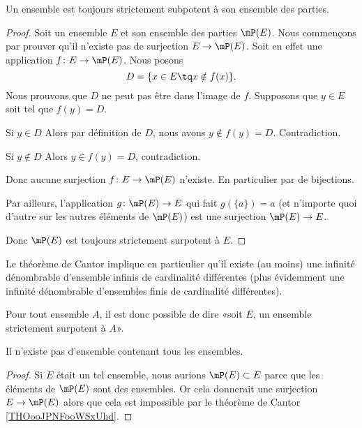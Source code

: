 \begin{theorem}     \label{THOooJPNFooWSxUhd}
    Un ensemble est toujours strictement subpotent à son ensemble des parties.
\end{theorem}

\begin{proof}
    Soit un ensemble \( E\) et son ensemble des parties \( \mP(E)\). Nous commençons par prouver qu'il n'existe pas de surjection \( E\to \mP(E)\). Soit en effet une application \( f\colon E\to \mP(E)\). Nous posons
    \begin{equation}
        D=\{ x\in E\tq x\notin f(x) \}.
    \end{equation}
    Nous prouvons que \( D\) ne peut pas être dans l'image de \( f\). Supposons que \( y\in E\) soit tel que \( f(y)=D\).
    \begin{subproof}
        \item[Si \( y\in D\)]
            Alors par définition de \( D\), nous avons \( y\notin f(y)=D\). Contradiction.
        \item[Si \( y\notin D\)]
            Alors \( y\in f(y)=D\), contradiction.
    \end{subproof}
    Donc aucune surjection \( f\colon E\to \mP(E)\) n'existe. En particulier par de bijections.

    Par ailleurs, l'application \( g\colon \mP(E)\to E\) qui fait \( g(\{ a \})=a\) (et n'importe quoi d'autre sur les autres éléments de \( \mP(E)\)) est une surjection \( \mP(E)\to E\).

    Donc \( \mP(E)\) est toujours strictement surpotent à \( E\).
\end{proof}

\begin{normaltext}
    Le théorème de Cantor implique en particulier qu'il existe (au moins) une infinité dénombrable d'ensemble infinis de cardinalité différentes (plus évidemment une infinité dénombrable d'ensembles finis de cardinalité différentes).

    Pour tout ensemble \( A\), il est donc possible de dire «soit \( E\), un ensemble strictement surpotent à \( A\)».
\end{normaltext}

\begin{corollary}
    Il n'existe pas d'ensemble contenant tous les ensembles.
\end{corollary}

\begin{proof}
    Si \( E\) était un tel ensemble, nous aurions \( \mP(E)\subset E\) parce que les éléments de \( \mP(E)\) sont des ensembles. Or cela donnerait une surjection \( E\to \mP(E)\) alors que cela est impossible par le théorème de Cantor \ref{THOooJPNFooWSxUhd}.
\end{proof}


